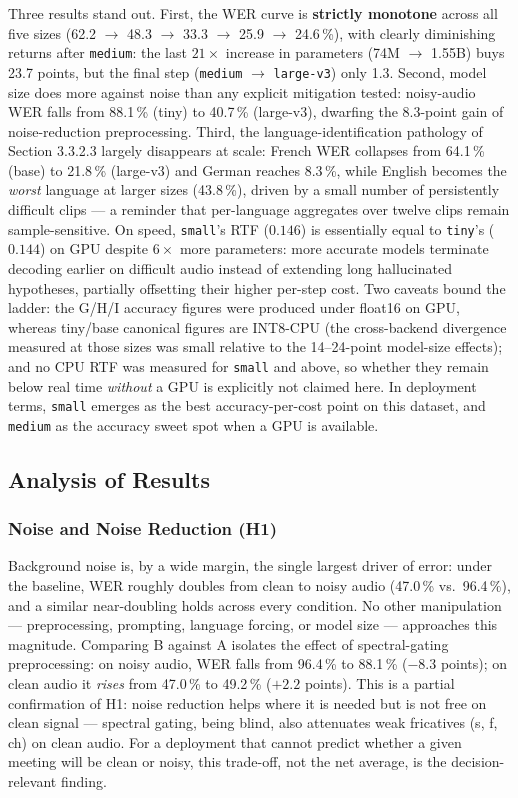 \documentclass[12pt]{report}
\begin{document}
Three results stand out. First, the WER curve is \textbf{strictly monotone} across all five sizes (62.2 $\to$ 48.3 $\to$ 33.3 $\to$ 25.9 $\to$ 24.6\,\%), with clearly diminishing returns after \texttt{medium}: the last $21\times$ increase in parameters (74M $\to$ 1.55B) buys 23.7 points, but the final step (\texttt{medium} $\to$ \texttt{large-v3}) only 1.3. Second, model size does more against noise than any explicit mitigation tested: noisy-audio WER falls from 88.1\,\% (tiny) to 40.7\,\% (large-v3), dwarfing the 8.3-point gain of noise-reduction preprocessing. Third, the language-identification pathology of Section 3.3.2.3 largely disappears at scale: French WER collapses from 64.1\,\% (base) to 21.8\,\% (large-v3) and German reaches 8.3\,\%, while English becomes the \emph{worst} language at larger sizes (43.8\,\%), driven by a small number of persistently difficult clips --- a reminder that per-language aggregates over twelve clips remain sample-sensitive. On speed, \texttt{small}'s RTF ($0.146$) is essentially equal to \texttt{tiny}'s ($0.144$) on GPU despite $6\times$ more parameters: more accurate models terminate decoding earlier on difficult audio instead of extending long hallucinated hypotheses, partially offsetting their higher per-step cost. Two caveats bound the ladder: the G/H/I accuracy figures were produced under float16 on GPU, whereas tiny/base canonical figures are INT8-CPU (the cross-backend divergence measured at those sizes was small relative to the 14--24-point model-size effects); and no CPU RTF was measured for \texttt{small} and above, so whether they remain below real time \emph{without} a GPU is explicitly not claimed here. In deployment terms, \texttt{small} emerges as the best accuracy-per-cost point on this dataset, and \texttt{medium} as the accuracy sweet spot when a GPU is available.

\subsection{Analysis of Results}

\subsubsection{Noise and Noise Reduction (H1)}

Background noise is, by a wide margin, the single largest driver of error: under the baseline, WER roughly doubles from clean to noisy audio (47.0\,\% vs.\ 96.4\,\%), and a similar near-doubling holds across every condition. No other manipulation --- preprocessing, prompting, language forcing, or model size --- approaches this magnitude. Comparing B against A isolates the effect of spectral-gating preprocessing: on noisy audio, WER falls from 96.4\,\% to 88.1\,\% ($-8.3$ points); on clean audio it \emph{rises} from 47.0\,\% to 49.2\,\% ($+2.2$ points). This is a partial confirmation of H1: noise reduction helps where it is needed but is not free on clean signal --- spectral gating, being blind, also attenuates weak fricatives (s, f, ch) on clean audio. For a deployment that cannot predict whether a given meeting will be clean or noisy, this trade-off, not the net average, is the decision-relevant finding.
\end{document}
